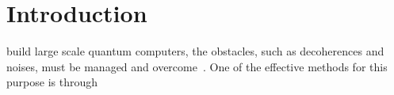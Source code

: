 \documentclass[journal]{IEEEtran}
\begin{document}
%
\IEEEpeerreviewmaketitle



\section{Introduction}
% 
% 
% 
% 
build large scale quantum computers, the obstacles, such as decoherences and noises,  must be managed and overcome~\cite{nielsen2010quantum}. One of the effective methods for this purpose is through
\end{document}
